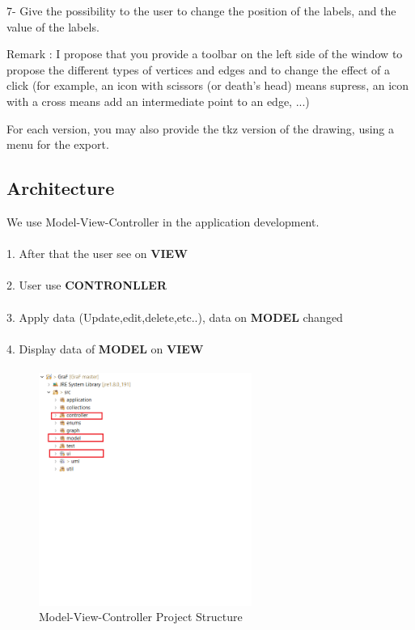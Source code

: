 \documentclass[a4paper,10pt]{article}
\begin{document}
7- Give the possibility to the user to change the position of the labels, and the value of the labels.

Remark : I propose that you provide a toolbar on the left side of the window to propose the different types of vertices and edges and to change the effect of a click (for example, an icon with scissors (or death's head) means supress, an icon with a cross means add an intermediate point to an edge, ...)

For each version, you may also provide the tkz version of the drawing, using a menu for the export.
\subsection{Architecture} 
We use Model-View-Controller in the application development.

\paragraph{}
1. After that the user see on \textbf{VIEW}
\paragraph{}
2. User use \textbf{CONTRONLLER}
\paragraph{}
3. Apply data (Update,edit,delete,etc..), data on \textbf{MODEL} changed
\paragraph{}
4. Display data of \textbf{MODEL} on \textbf{VIEW}

\paragraph{}
\begin{figure}[H]
		\centering
		\includegraphics[height = 3in]{structure.png}
		\caption[Optional caption]{Model-View-Controller Project Structure}
		\label{fig:Repository}
	\end{figure}
\end{document}
